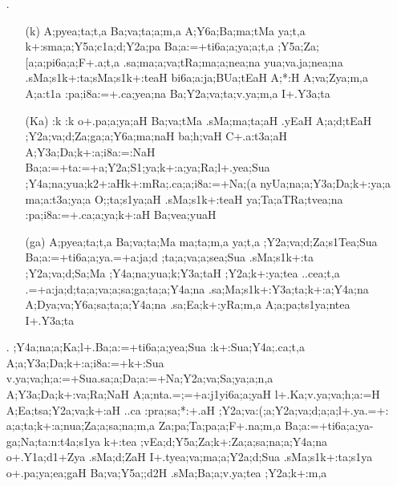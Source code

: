 \begin{spacing}{1.15}
\begin{itemize}
\item[{\sktf 4}.] \begin{itemize}
  \item[({\sktf k})] {\sktf A;pyea;ta;t,a Ba;va;ta;a;m,a A;Y6a;Ba;ma;tMa
ya;t,a k+:sma;a;Y5a;c1a;d;Y2a;pa Ba;a:=+ti6a;a;ya;a;t,a
;Y5a;Za;[a;a;pi6a;a;F+.a;t,a .sa;ma;a;va;tRa;ma;a;nea;na yua{;va}.ja;nea;na .sMa;s1k+:ta;sMa;s1k+:teaH%
 bi6a;a:ja;BUa;tEaH A;*:H%
 A;va;Zya;m,a A;a:t1a :pa;i8a:=+.ca;yea;na Ba;Y2a;va;ta;v.ya;m,a
I+.Y3a;ta}
                
   \item[({\sktf Ka})] {\sktf :k :k o+.pa;a;ya;aH
Ba;va;tMa .sMa;ma;ta;aH .yEaH A;a;d;tEaH
;Y2a;va;d;Za;ga;a;Y6a;ma;naH ba;h;vaH C+.a:t3a;aH
A;Y3a;Da;k+:a;i8a:=:NaH\ZF{,} Ba;a:=+ta:=+a;Y2a;S1;ya;k+:a;ya;Ra;l+.yea;Sua
;Y4a;na;yua;k2+:aH\break k+:mRa;.ca;a;i8a:=+Na;(a\ZF{,}
nyUa;na;a;Y3a;Da;k+:ya;a ma;a:t3a;ya;a O;;ta;s1ya;aH
.sMa;s1k+:teaH ya;Ta;aTRa;tvea;na :pa;i8a:=+.ca;a;ya;k+:aH Ba;vea;yuaH}
                
 \item[({\sktf ga})] {\sktf A;pyea;ta;t,a Ba;va;ta;Ma ma;ta;m,a\ZF{,} ya;t,a
;Y2a;va;d;Za;s1Tea;Sua Ba;a:=+ti6a;a;ya\ZF{-}.=+a:ja;d%
;ta;a;va;a;sea;Sua .sMa;s1k+:ta
;Y2a;va;d;Sa;Ma ;Y4a;na;yua;k;Y3a;taH ;Y2a;k+:ya;tea ..cea;t,a\ZF{,}
.=+a:ja;d;ta;a;va;a;sa;ga;ta;a;Y4a;na .sa;Ma;s1k+:Y3a;ta;k+:a;Y4a;na A;Dya;va;Y6a;sa;ta;a;Y4a;na .sa;Ea;k+:yRa;m,a
A;a;pa;ts1ya;ntea I+.Y3a;ta}
\end{itemize} 
           
 \item[{\sktf 5}.]  {\sktf ;Y4a;na;a;Ka;l+.Ba;a:=+ti6a;a;yea;Sua
:k+:Sua;Y4a;.ca;t,a A;a;Y3a;Da;k+:a;i8a:=+k+:Sua
v.ya;va;h;a:=+Sua\ZF{-}.sa;a;Da;a:=+Na;Y2a;va;Sa;ya;a;n,a
A;Y3a;Da;k+:va;Ra;NaH A;a{;nta}.=;=+a:j1yi6a;a;yaH l+.Ka;v.ya;va;h;a:=H\ZF{,}
A;Ea;tsa;Y2a;va;k+:aH ..ca :pra;sa;*:+.aH
;Y2a;va:(;a;Y2a;va;d;a;a;l+.ya\ZF{-}.=+:%
a;a;ta;k+:a;nua;Za;a;sa;na;m,a\ZF{,} Za;pa;Ta;pa;a;F+.na;m,a
Ba;a:=+ti6a;a;ya}-{\sktf ga;Na;ta:n:t4a;s1ya k+:tea
;vEa;d;Y5a;Za;k+:Za;a;sa;na;a;Y4a;na o+.Y1a;d1+Zya
.sMa;d;ZaH\ZF{,} I+.tyea;va;ma;a;Y2a;d;Sua\ZF{-}}{\sktf
.sMa;s1k+:ta;s1ya o+.pa;ya;ea;gaH
Ba;va;Y5a;;d2H .sMa;Ba;a;v.ya;tea ;Y2a;k+:m,a}
 

\end{itemize}
\end{spacing}
